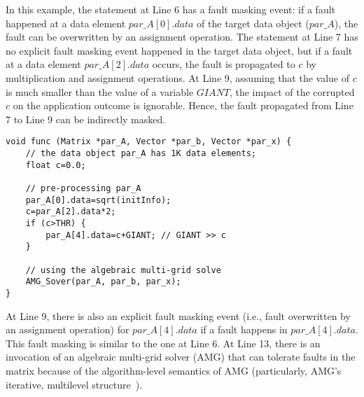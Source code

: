 In this example, the statement at Line 6 has a fault masking event:
if a fault happened at a data element $par\_A[0].data$ of the target data object ($par\_A$), the fault can be overwritten by an assignment operation.
The statement at Line 7 has no explicit fault masking event happened in the target data
object, but if a fault at a data element $par\_A[2].data$ occurs, the fault is propagated to $c$ by multiplication and assignment operations.
At Line 9, assuming that the value of $c$ is much smaller than the value of a variable $GIANT$, 
the impact of the corrupted $c$ on the application outcome is ignorable.
Hence, the fault propagated from Line 7 to Line 9 can be indirectly masked.

\begin{lstlisting}[label={fig:general_desc}, caption={An example code to show application-level fault masking}]
void func (Matrix *par_A, Vector *par_b, Vector *par_x) {
	// the data object par_A has 1K data elements;
    float c=0.0;
    
    // pre-processing par_A
    par_A[0].data=sqrt(initInfo);
    c=par_A[2].data*2;
    if (c>THR) {
    	par_A[4].data=c+GIANT; // GIANT >> c
    }
    
    // using the algebraic multi-grid solve
    AMG_Sover(par_A, par_b, par_x);
}
\end{lstlisting}


At Line 9, there is also an explicit fault masking event (i.e., fault overwritten by an assignment operation) for $par\_A[4].data$ if a fault happens in $par\_A[4].data$. This fault masking is similar to the one at Line 6.
At Line 13, there is an invocation of an algebraic multi-grid solver (AMG)
that can tolerate faults in the matrix because of the algorithm-level semantics of AMG (particularly, AMG's iterative, multilevel structure~\cite{mg_ics12}).

